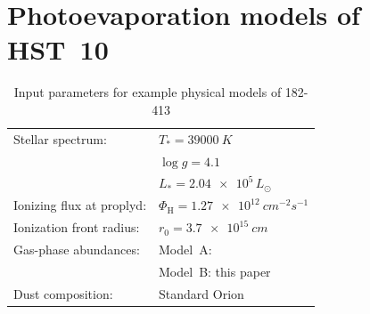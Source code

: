 \documentclass[useAMS,usenatbib]{mn2e}
\begin{document}
\addtocounter{section}{3}
\addtocounter{table}{2}
\addtocounter{figure}{7}

\section{Photoevaporation models of HST~10}
\label{sec:phot-models-hst}
\begin{table}
  \centering
  \caption{Input parameters for example physical models of 182-413} 
  \begin{tabular}{@{\,}ll@{\,}}\hline
    Stellar spectrum:& 
    \(T_* = \SI{39000}{K}\)\\
    \citep{2006AandA...448..351S} & \(\log g = 4.1\)\\
    & \(L_* = \num{2.04e5}\,L_\odot\)\\
    Ionizing flux at proplyd:& 
    \(\Phi_{\mathrm{H}} = \SI{1.27e12}{cm^{-2} s^{-1}}\)
    \\
    Ionization front radius:& 
    \(r_0 = \SI{3.7e15}{cm}\)
    \\
    Gas-phase abundances: & 
    Model~A: \citet{2004MNRAS.355..229E}\\
    & Model~B: this paper
    \\
    Dust composition: & Standard Orion \citep{1991ApJ...374..580B}\\
    \hline
  \end{tabular}
  \label{tab:model:pars}
\end{table}
\end{document}
